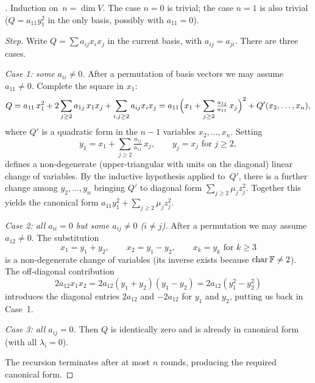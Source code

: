 \begin{proof}[]
Induction on~$n = \dim V$. The case $n = 0$ is trivial; the case
$n = 1$ is also trivial ($Q = a_{11} y_1^2$ in the only basis, possibly
with $a_{11} = 0$).

\emph{Step.} Write $Q = \sum a_{ij} x_i x_j$ in the current basis,
with $a_{ij} = a_{ji}$. There are three cases.

\emph{Case 1: some $a_{ii} \neq 0$.} After a permutation of basis
vectors we may assume $a_{11} \neq 0$. Complete the square in $x_1$:
\[
  Q = a_{11}\,x_1^2 + 2 \sum_{j \ge 2} a_{1j}\, x_1 x_j + \sum_{i, j \ge 2} a_{ij} x_i x_j
   = a_{11}\Bigl(x_1 + \sum_{j \ge 2} \tfrac{a_{1j}}{a_{11}}\,x_j\Bigr)^2 + Q'(x_2, \dots, x_n),
\]
where $Q'$ is a quadratic form in the $n - 1$ variables
$x_2, \dots, x_n$. Setting
\[
  y_1 = x_1 + \sum_{j \ge 2} \tfrac{a_{1j}}{a_{11}}\, x_j, \qquad y_j = x_j \text{ for } j \ge 2,
\]
defines a non-degenerate (upper-triangular with units on the diagonal)
linear change of variables. By the inductive hypothesis applied to~$Q'$,
there is a further change among $y_2, \dots, y_n$ bringing $Q'$ to
diagonal form $\sum_{j \ge 2} \mu_j z_j^2$. Together this yields the
canonical form $a_{11} y_1^2 + \sum_{j \ge 2} \mu_j z_j^2$.

\emph{Case 2: all $a_{ii} = 0$ but some $a_{ij} \neq 0$ ($i \neq j$).}
After a permutation we may assume $a_{12} \neq 0$. The substitution
\[
  x_1 = y_1 + y_2, \qquad x_2 = y_1 - y_2, \qquad x_k = y_k \text{ for } k \ge 3
\]
is a non-degenerate change of variables (its inverse exists because
$\operatorname{char} \mathbb{F} \neq 2$). The off-diagonal contribution
\[
  2 a_{12} x_1 x_2 = 2 a_{12} (y_1 + y_2)(y_1 - y_2) = 2 a_{12} (y_1^2 - y_2^2)
\]
introduces the diagonal entries $2 a_{12}$ and $-2 a_{12}$ for $y_1$
and $y_2$, putting us back in Case~1.

\emph{Case 3: all $a_{ij} = 0$.} Then $Q$ is identically zero and is
already in canonical form (with all $\lambda_i = 0$).

The recursion terminates after at most $n$ rounds, producing the
required canonical form.
\end{proof}

